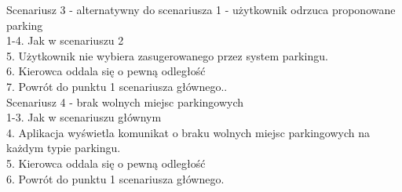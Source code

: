 \noindent Scenariusz 3 - alternatywny do scenariusza 1 - użytkownik odrzuca proponowane parking \\
\hspace*{1cm} 1-4. 	Jak w scenariuszu 2 \\
\hspace*{1cm} 5.	Użytkownik nie wybiera zasugerowanego przez system parkingu. \\
\hspace*{1cm} 6. Kierowca oddala się o pewną odległość \\
\hspace*{1cm} 7. Powrót do punktu 1  scenariusza głównego.. \\


\noindent Scenariusz 4 - brak wolnych miejsc parkingowych \\
\hspace*{1cm} 1-3. 	Jak w scenariuszu głównym \\
\hspace*{1cm} 4.	Aplikacja wyświetla komunikat o braku wolnych miejsc parkingowych na każdym typie parkingu. \\
\hspace*{1cm} 5. Kierowca oddala się o pewną odległość \\
\hspace*{1cm} 6. Powrót do punktu 1 scenariusza głównego. \\
